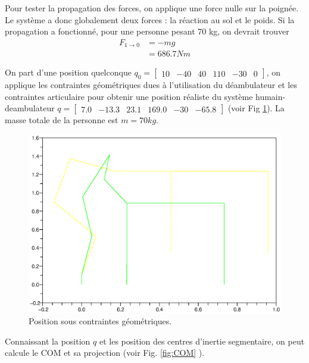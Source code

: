 \documentclass[a4paper, 10pt ]{article}
\begin{document}
Pour tester  la propagation des forces, on applique une force nulle sur la poignée. Le système a donc globalement deux forces : la réaction au sol et le poids. Si la propagation a fonctionné, pour une personne pesant 70 kg, on devrait trouver 
\begin{align}
F_{1\rightarrow 0}&=-mg\\
&=686.7Nm
\end{align}


On part d'une position quelconque $q_0=\begin{bmatrix}10& -40& 40& 110& -30& 0\end{bmatrix}$, on applique les contraintes géométriques dues à l'utilisation du déambulateur et les contraintes articulaire pour obtenir une position réaliste du système humain-deambulateur $q= \begin{bmatrix}7.0&-13.3&23.1&169.0&-30&-65.8\end{bmatrix}$ (voir Fig \ref{fig:positionContrainteF}). La masse totale de la personne est $m=70kg$.

 
 \begin{figure}[h]
\centering
\includegraphics[width=0.8\columnwidth]{images/simu/Fext0/positionContrainte.eps}
\caption{Position sous contraintes géométriques.}%
\label{fig:positionContrainteF}
\end{figure}

Connaissant la position $q$ et les position des centres d'inertie segmentaire, on peut calcule le COM et sa projection (voir Fig. \ref{fig:COM} ).
\end{document}
